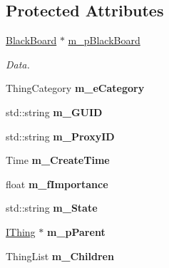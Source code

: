 \subsection*{Protected Attributes}
\begin{DoxyCompactItemize}
\item 
\mbox{\label{class_i_thing_aa3e6a2793c501cae74be9f89be740178}} 
\hyperlink{class_black_board}{Black\+Board} $\ast$ \hyperlink{class_i_thing_aa3e6a2793c501cae74be9f89be740178}{m\+\_\+p\+Black\+Board}
\begin{DoxyCompactList}\small\item\em Data. \end{DoxyCompactList}\item 
\mbox{\label{class_i_thing_a1369be496eddca6ea2b123cd568a239b}} 
Thing\+Category {\bfseries m\+\_\+e\+Category}
\item 
\mbox{\label{class_i_thing_aeee4e1937ea9dab9aa77d650245a2882}} 
std\+::string {\bfseries m\+\_\+\+G\+U\+ID}
\item 
\mbox{\label{class_i_thing_a35f19087d88f1c13e2269dc91b5477ba}} 
std\+::string {\bfseries m\+\_\+\+Proxy\+ID}
\item 
\mbox{\label{class_i_thing_aa5d15b0d7256da558a94c530b34e183a}} 
Time {\bfseries m\+\_\+\+Create\+Time}
\item 
\mbox{\label{class_i_thing_ab9a26b71e7eae17b3ed3fb799073f5c1}} 
float {\bfseries m\+\_\+f\+Importance}
\item 
\mbox{\label{class_i_thing_a91f80b83c293ef0b830573b6ea86bd03}} 
std\+::string {\bfseries m\+\_\+\+State}
\item 
\mbox{\label{class_i_thing_a7a42e6fb8a5d33375b675be285a5cbd3}} 
\hyperlink{class_i_thing}{I\+Thing} $\ast$ {\bfseries m\+\_\+p\+Parent}
\item 
\mbox{\label{class_i_thing_a2389e5094a2c8d5ca7287803a6eac677}} 
Thing\+List {\bfseries m\+\_\+\+Children}
\item 
\mbox{\label{class_i_thing_adc7b3f0aa7d370b9cbba806414428591}} 

\end{DoxyCompactItemize}
